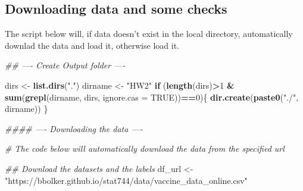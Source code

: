 \documentclass[]{article}
\newenvironment{Shaded}{\begin{snugshade}}{\end{snugshade}}
\newcommand{\CommentTok}[1]{\textcolor[rgb]{0.56,0.35,0.01}{\textit{#1}}}
\newcommand{\ControlFlowTok}[1]{\textcolor[rgb]{0.13,0.29,0.53}{\textbf{#1}}}
\newcommand{\DataTypeTok}[1]{\textcolor[rgb]{0.13,0.29,0.53}{#1}}
\newcommand{\DecValTok}[1]{\textcolor[rgb]{0.00,0.00,0.81}{#1}}
\newcommand{\KeywordTok}[1]{\textcolor[rgb]{0.13,0.29,0.53}{\textbf{#1}}}
\newcommand{\NormalTok}[1]{#1}
\newcommand{\OperatorTok}[1]{\textcolor[rgb]{0.81,0.36,0.00}{\textbf{#1}}}
\newcommand{\OtherTok}[1]{\textcolor[rgb]{0.56,0.35,0.01}{#1}}
\newcommand{\StringTok}[1]{\textcolor[rgb]{0.31,0.60,0.02}{#1}}
\begin{document}
\hypertarget{downloading-data-and-some-checks}{%
\subsection{Downloading data and some
checks}\label{downloading-data-and-some-checks}}

The script below will, if data doesn't exist in the local directory,
automatically downlad the data and load it, otherwise load it.

\begin{Shaded}
\begin{Highlighting}[]
\CommentTok{## ---- Create Output folder ----}

\NormalTok{dirs <-}\StringTok{ }\KeywordTok{list.dirs}\NormalTok{(}\StringTok{"."}\NormalTok{)}
\NormalTok{dirname <-}\StringTok{ "HW2"}
\ControlFlowTok{if}\NormalTok{ (}\KeywordTok{length}\NormalTok{(dirs)}\OperatorTok{>}\DecValTok{1} \OperatorTok{&}\StringTok{ }\KeywordTok{sum}\NormalTok{(}\KeywordTok{grepl}\NormalTok{(dirname, dirs, }\DataTypeTok{ignore.cas =} \OtherTok{TRUE}\NormalTok{))}\OperatorTok{==}\DecValTok{0}\NormalTok{)\{}
    \KeywordTok{dir.create}\NormalTok{(}\KeywordTok{paste0}\NormalTok{(}\StringTok{"./"}\NormalTok{, dirname))}
\NormalTok{\}}

\CommentTok{#### ---- Downloading the data ----}

\CommentTok{# The code below will automatically download the data from the specified url}

\CommentTok{## Download the datasets and the labels}
\NormalTok{df_url <-}\StringTok{ "https://bbolker.github.io/stat744/data/vaccine_data_online.csv"}


\end{Highlighting}
\end{Shaded}
\end{document}
